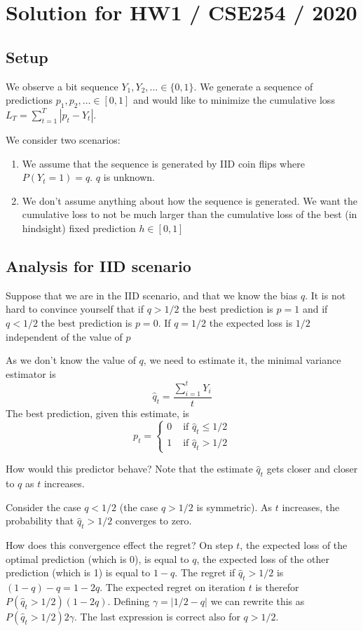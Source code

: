\documentclass[12pt]{article}
\begin{document}
 
 
\section{Solution for HW1 / CSE254 / 2020}
\subsection{Setup}
We observe a bit sequence $Y_1,Y_2,\ldots \in \{0,1\}$. We generate a
sequence of predictions $p_1,p_2,\ldots \in [0,1]$ and would like to
minimize the cumulative loss $L_T = \sum_{t=1}^T |p_t - Y_t|$.

We consider two scenarios:
\begin{enumerate}
  \item We assume that the sequence is generated by IID coin flips
    where $P(Y_t=1) = q$. $q$ is unknown.
  \item We don't assume anything about how the sequence is
    generated. We want the cumulative loss to not be much larger than
    the cumulative loss of the best (in hindsight) fixed prediction $h
    \in [0,1]$
\end{enumerate}

\subsection{Analysis for IID scenario}
Suppose that we are in the IID scenario, and that we know the bias
$q$. It is not hard to convince yourself that if $q>1/2$ the best
prediction is $p=1$ and if $q<1/2$ the best prediction is $p=0$. If
$q=1/2$ the expected loss is $1/2$ independent of the value of $p$

As we don't know the value of $q$, we need to estimate it, the minimal
variance estimator is
\newcommand{\hq}{\hat{q}_t}
$$\hq = \frac{\sum_{i=1}^t Y_i}{t}$$
The best prediction, given this estimate, is
\[
  p_t =
  \begin{cases}
  0 & \mbox{ if }  \hq \leq 1/2 \\
  1 & \mbox{ if }  \hq > 1/2
  \end{cases}
\]

How would this predictor behave? Note that the estimate $\hq$ gets
closer and closer to $q$ as $t$ increases.

Consider the case $q<1/2$ (the case $q>1/2$ is symmetric).
As $t$ increases, the probability that $\hq>1/2$ converges to zero.

How does this convergence effect the regret?
On step $t$, the expected loss of the optimal prediction (which is 0),
is equal to $q$, the expected loss of the other prediction (which is
1) is equal to $1-q$. The regret if $\hq>1/2$ is $(1-q)-q = 1-2q$.
The expected regret on iteration $t$ is therefor $P(\hq>1/2)(1-2q)$.
Defining $\gamma = |1/2-q|$ we can rewrite this as $P(\hq > 1/2) 2
\gamma$. The last expression is correct also for $q>1/2$.
\end{document}
